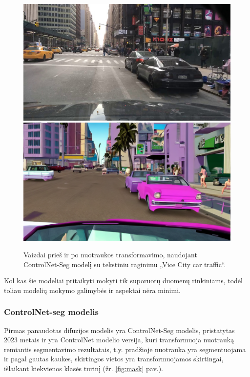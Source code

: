 \documentclass{VUMIFPSbakalaurinis}
\begin{document}
        \begin{figure}[H]
            \centering
            \includegraphics[scale=0.3]{img/diffusion/controlnet/before}
            \includegraphics[scale=0.4287]{img/diffusion/controlnet/after}
            \caption{Vaizdai prieš ir po nuotraukos transformavimo, naudojant ControlNet-Seg modelį su tekstiniu raginimu „Vice City car traffic“.\cite{ControlNetSeg}}
            \label{img:controlnet}
        \end{figure}

        Kol kas šie modeliai pritaikyti mokyti tik suporuotų duomenų rinkiniams, todėl toliau modelių mokymo galimybės ir aspektai nėra minimi. 
        
        \subsubsection{ControlNet-seg modelis}
            Pirmas panaudotas difuzijos modelis yra ControlNet-Seg modelis, pristatytas 2023 metais ir yra ControlNet modelio \cite{ControlNet} versija, kuri transformuoja nuotrauką remiantis segmentavimo rezultatais, t.y. pradžioje nuotrauka yra segmentuojama ir pagal gautas kaukes, skirtingos vietos yra transformuojamos skirtingai, išlaikant kiekvienos klasės turinį (žr. \ref{fig:mask} pav.).
\end{document}
